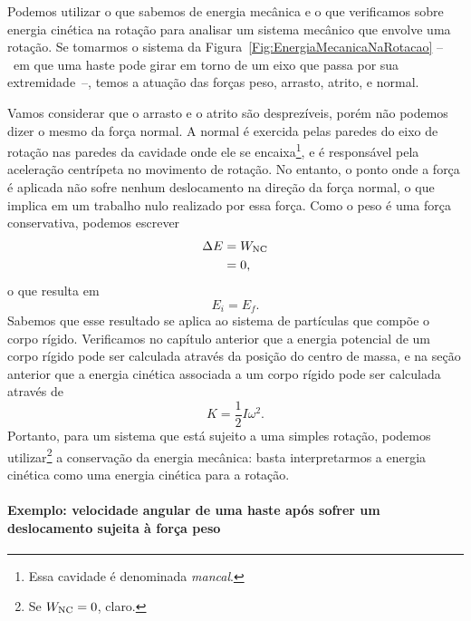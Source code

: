 Podemos utilizar o que sabemos de energia mecânica e o que verificamos sobre energia cinética na rotação para analisar um sistema mecânico que envolve uma rotação. Se tomarmos o sistema da Figura~\ref{Fig:EnergiaMecanicaNaRotacao} --~em que uma haste pode girar em torno de um eixo que passa por sua extremidade~--, temos a atuação das forças peso, arrasto, atrito, e normal.

Vamos considerar que o arrasto e o atrito são desprezíveis, porém não podemos dizer o mesmo da força normal. A normal é exercida pelas paredes do eixo de rotação nas paredes da cavidade onde ele se encaixa\footnote{Essa cavidade é denominada \emph{mancal}.}, e é responsável pela aceleração centrípeta no movimento de rotação. No entanto, o ponto onde a força é aplicada não sofre nenhum deslocamento na direção da força normal, o que implica em um trabalho nulo realizado por essa força. Como o peso é uma força conservativa, podemos escrever
\begin{align}
    \Delta E &= W_{\rm{NC}} \\
    &= 0,
\end{align}
%
o que resulta em
\begin{equation}
    E_i = E_f.
\end{equation}
%
Sabemos que esse resultado se aplica ao sistema de partículas que compõe o corpo rígido. Verificamos no capítulo anterior que a energia potencial de um corpo rígido pode ser calculada através da posição do centro de massa, e na seção anterior que a energia cinética associada a um corpo rígido pode ser calculada através de 
\begin{equation}
    K = \frac{1}{2} I\omega^2.
\end{equation}
%
Portanto, para um sistema que está sujeito a uma simples rotação, podemos utilizar\footnote{Se $W_{\rm{NC}} = 0$, claro.} a conservação da energia mecânica: basta interpretarmos a energia cinética como uma energia cinética para a rotação.

\paragraph{Exemplo: velocidade angular de uma haste após sofrer um deslocamento sujeita à força peso}

